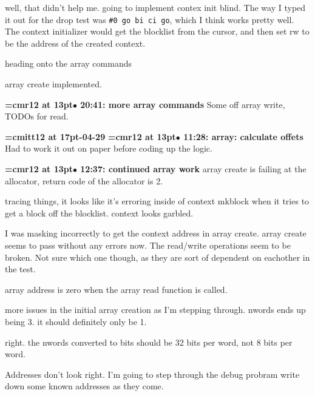 well, that didn't help me. going to implement contex init blind. The way I typed it out for the drop test was {\tt \#0 go bi ci go}, which I think works pretty well. The context initializer would get the blocklist from the cursor, and then set rw to be the address of the created context.
\par

heading onto the array commands
\par

array create implemented.
\par

{\smallskip\noindent\bf\font\titlefont=cmr12 at 13pt\titlefont $\bullet$ 20:41: more array commands}\smallskip
Some off array write, TODOs for read.
\par

{\medskip\noindent\bf\font\titlefont=cmitt12 at 17pt-04-29}\medskip
{\smallskip\noindent\bf\font\titlefont=cmr12 at 13pt\titlefont $\bullet$ 11:28: array: calculate offets}\smallskip
Had to work it out on paper before coding up the logic.
\par

{\smallskip\noindent\bf\font\titlefont=cmr12 at 13pt\titlefont $\bullet$ 12:37: continued array work}\smallskip
array create is failing at the allocator, return code of the allocator is 2.
\par

tracing things, it looks like it's erroring inside of context mkblock when it tries to get a block off the blocklist. context looks garbled.
\par

I was masking incorrectly to get the context address in array create. array create seems to pass without any errors now. The read/write operations seem to be broken. Not sure which one though, as they are sort of dependent on eachother in the test.
\par

array address is zero when the array read function is called.
\par

more issues in the initial array creation as I'm stepping through. nwords ends up being 3. it should definitely only be 1.
\par

right. the nwords converted to bits should be 32 bits per word, not 8 bits per word.
\par

Addresses don't look right. I'm going to step through the debug probram write down some known addresses as they come.
\par

